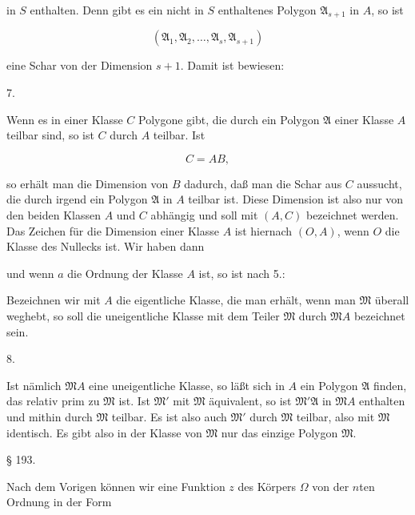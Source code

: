
in $S$ enthalten. Denn gibt es ein nicht in $S$ enthaltenes Polygon
$\mathfrak{A}_{s+1}$ in $A$, so ist

\[
(\mathfrak{A}_1, \mathfrak{A}_2, \ldots, \mathfrak{A}_s, \mathfrak{A}_{s+1})
\]

eine Schar von der Dimension $s+1$. Damit ist bewiesen:

7. 

Wenn es in einer Klasse $C$ Polygone gibt, die durch ein
Polygon $\mathfrak{A}$ einer Klasse $A$ teilbar sind, so ist $C$ durch $A$ teilbar.
Ist

\[
C = AB,
\]

so erhält man die Dimension von $B$ dadurch, daß man die Schar
aus $C$ aussucht, die durch irgend ein Polygon $\mathfrak{A}$ in $A$ teilbar
ist. Diese Dimension ist also nur von den beiden Klassen $A$
und $C$ abhängig und soll mit $(A, C)$ bezeichnet werden. Das
Zeichen für die Dimension einer Klasse $A$ ist hiernach $(O, A)$,
wenn $O$ die Klasse des Nullecks ist. Wir haben dann


und wenn $a$ die Ordnung der Klasse $A$ ist, so ist nach 5.:


Bezeichnen wir mit $A$ die eigentliche Klasse, die man erhält,
wenn man $\mathfrak{M}$ überall weghebt, so soll die uneigentliche Klasse
mit dem Teiler $\mathfrak{M}$ durch $\mathfrak{M}A$ bezeichnet sein.

8. 

Ist nämlich $\mathfrak{M}A$ eine uneigentliche Klasse, so läßt sich in
$A$ ein Polygon $\mathfrak{A}$ finden, das relativ prim zu $\mathfrak{M}$ ist. Ist $\mathfrak{M}'$ mit
$\mathfrak{M}$ äquivalent, so ist $\mathfrak{M}'\mathfrak{A}$ in $\mathfrak{M}A$ enthalten und mithin durch
$\mathfrak{M}$ teilbar. Es ist also auch $\mathfrak{M}'$ durch $\mathfrak{M}$ teilbar, also mit $\mathfrak{M}$
identisch. Es gibt also in der Klasse von $\mathfrak{M}$ nur das einzige
Polygon $\mathfrak{M}$.

\begin{center}
§ 193. 
\end{center}

Nach dem Vorigen können wir eine Funktion $z$ des Körpers
$\Omega$ von der $n$ten Ordnung in der Form

